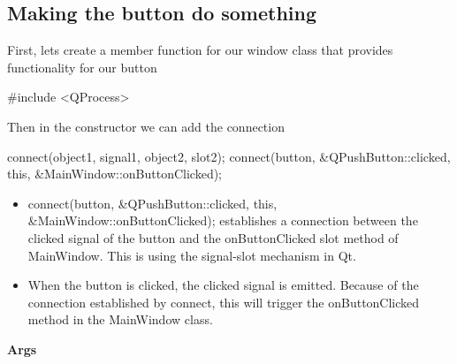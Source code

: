 \documentclass{report}
\begin{document}
    \subsection*{Making the button do something}
    \bigbreak \noindent 
    First, lets create a member function for our window class that provides functionality for our button
    \bigbreak \noindent 
    \begin{cppcode}
#include <QProcess>
    \end{cppcode}
    \bigbreak \noindent 
    \pagebreak \bigbreak \noindent 
    Then in the constructor we can add the connection 
    \bigbreak \noindent 
    \begin{cppcode}
    connect(object1, signal1, object2, slot2);
    connect(button, &QPushButton::clicked, this, &MainWindow::onButtonClicked);
    \end{cppcode}
    \begin{itemize}
        \item connect(button, &QPushButton::clicked, this, &MainWindow::onButtonClicked); establishes a connection between the clicked signal of the button and the onButtonClicked slot method of MainWindow. This is using the signal-slot mechanism in Qt.
        \item When the button is clicked, the clicked signal is emitted. Because of the connection established by connect, this will trigger the onButtonClicked method in the MainWindow class.
    \end{itemize}
    \bigbreak \noindent 
    \textbf{Args}
\end{document}
